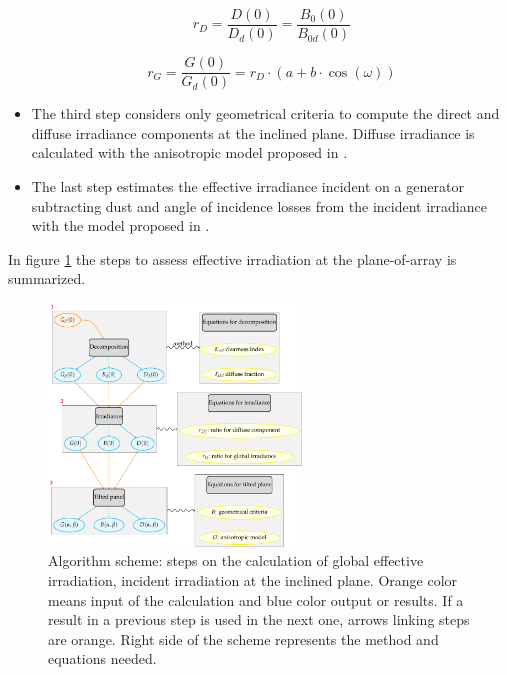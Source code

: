 \begin{itemize}
\begin{equation}\label{ratioB0}
r_{D}=\frac{D(0)}{D_d(0)}=\frac{B_0(0)}{B_{0d}(0)}
\end{equation}


\begin{equation}\label{ratioG0}
r_G=\frac{G(0)}{G_d(0)}=r_D\cdot(a+b\cdot\cos(\omega))
\end{equation}


\item The third step considers only geometrical criteria to compute the direct and diffuse irradiance components at the inclined plane.
  Diffuse irradiance is calculated with the anisotropic model proposed in \cite{hay1985estimating}. 

\item The last step estimates the effective irradiance incident on a generator subtracting dust and angle of incidence losses from the incident irradiance with the model proposed in \cite{Martin2001}.

\end{itemize}

In figure \ref{fig:algorithm_outline} the steps to assess effective irradiation at the plane-of-array is summarized.

\begin{figure}
  \centering
  \includegraphics[width=0.6\textwidth]{figs/algorithm_outline}
  \caption{Algorithm scheme: steps on the calculation of global effective irradiation, incident irradiation at the inclined plane. Orange color means input of the calculation and blue color output or results. If a result in a previous step is used in the next one, arrows linking steps are orange. Right side of the scheme represents the method and equations needed.}
 \label{fig:algorithm_outline}
\end{figure}

